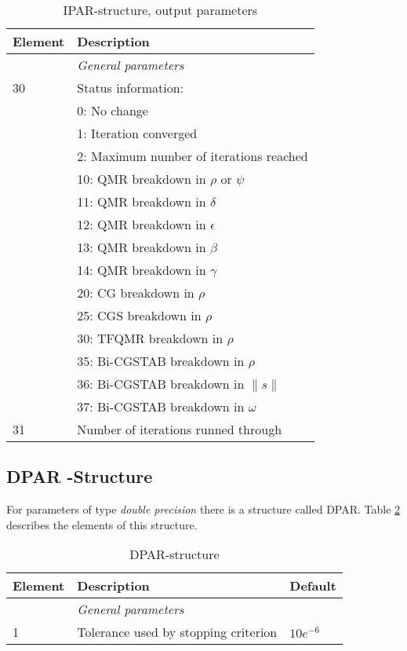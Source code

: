 \documentclass[11pt,a4paper,english,oneside]{report}
\begin{document}
\begin{table}[H]

\begin{tabular*}{\textwidth}{ll}
\hline\hline
{\bfseries Element} & {\bfseries Description} \\
\hline\hline
	& {\em General parameters} \\
\hline
30 	& Status information: \\
	& 0: No change \\
	& 1: Iteration converged \\
	& 2: Maximum number of iterations reached \\
	& 10: QMR breakdown in $\rho$ or $\psi$ \\
	& 11: QMR breakdown in $\delta$ \\
	& 12: QMR breakdown in $\epsilon$ \\
	& 13: QMR breakdown in $\beta$ \\
	& 14: QMR breakdown in $\gamma$ \\
	& 20: CG breakdown in $\rho$ \\
	& 25: CGS breakdown in $\rho$ \\
	& 30: TFQMR breakdown in $\rho$ \\
	& 35: Bi-CGSTAB breakdown in $\rho$ \\
	& 36: Bi-CGSTAB breakdown in $\|s\|$ \\
	& 37: Bi-CGSTAB breakdown in $\omega$ \\
31 	& Number of iterations runned through \\
\hline\hline
\end{tabular*}

\caption{IPAR-structure, output parameters}
\label{table:ipar-output}
\end{table}

\subsection{DPAR -Structure}
\label{sec:dpars}

For parameters of type {\em double precision} there is a structure
called {\ttfamily DPAR}. Table \ref{table:dpar} describes the
elements of this structure.

\begin{table}[h]
\begin{tabular*}{\textwidth}{lll}
\hline\hline
{\bfseries Element} & {\bfseries Description} & {\bfseries Default} \\
\hline\hline
	& {\em General parameters} & \\
\hline
1 	& Tolerance used by stopping criterion & $10e^{-6}$ \\
\hline\hline
\end{tabular*}
\caption{DPAR-structure}
\label{table:dpar}
\end{table}
\end{document}
